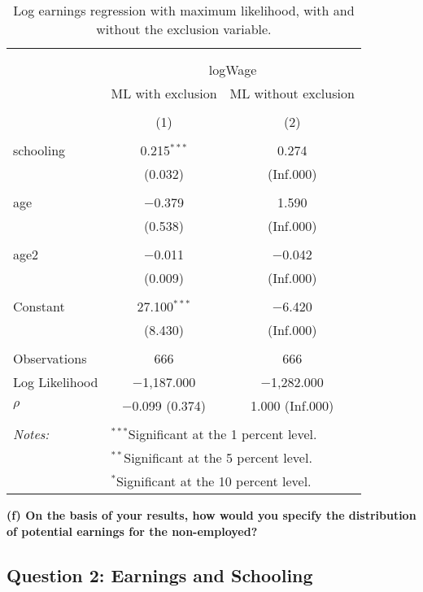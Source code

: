 \documentclass[
]{article}
\begin{document}
\begin{table}[!htbp] \centering 
  \caption{Log earnings regression with maximum likelihood, 
          with and without the exclusion variable.} 
  \label{tab:q1_e} 
\small 
\begin{tabular}{@{\extracolsep{5pt}}lcc} 
\\[-1.8ex]\hline 
\hline \\[-1.8ex] 
\\[-1.8ex] & \multicolumn{2}{c}{logWage} \\ 
 & ML with exclusion & ML without exclusion \\ 
\\[-1.8ex] & (1) & (2)\\ 
\hline \\[-1.8ex] 
 schooling & 0.215$^{***}$ & 0.274 \\ 
  & (0.032) & (Inf.000) \\ 
  & & \\ 
 age & $-$0.379 & 1.590 \\ 
  & (0.538) & (Inf.000) \\ 
  & & \\ 
 age2 & $-$0.011 & $-$0.042 \\ 
  & (0.009) & (Inf.000) \\ 
  & & \\ 
 Constant & 27.100$^{***}$ & $-$6.420 \\ 
  & (8.430) & (Inf.000) \\ 
  & & \\ 
Observations & 666 & 666 \\ 
Log Likelihood & $-$1,187.000 & $-$1,282.000 \\ 
$\rho$ & $-$0.099  (0.374) & 1.000  (Inf.000) \\ 
\hline \\[-1.8ex] 
\textit{Notes:} & \multicolumn{2}{l}{$^{***}$Significant at the 1 percent level.} \\ 
 & \multicolumn{2}{l}{$^{**}$Significant at the 5 percent level.} \\ 
 & \multicolumn{2}{l}{$^{*}$Significant at the 10 percent level.} \\ 
\end{tabular} 
\end{table}

\textbf{(f) On the basis of your results, how would you specify the
distribution of potential earnings for the non-employed?}

\clearpage

\hypertarget{question-2-earnings-and-schooling}{%
\subsection{Question 2: Earnings and
Schooling}\label{question-2-earnings-and-schooling}}
\end{document}

